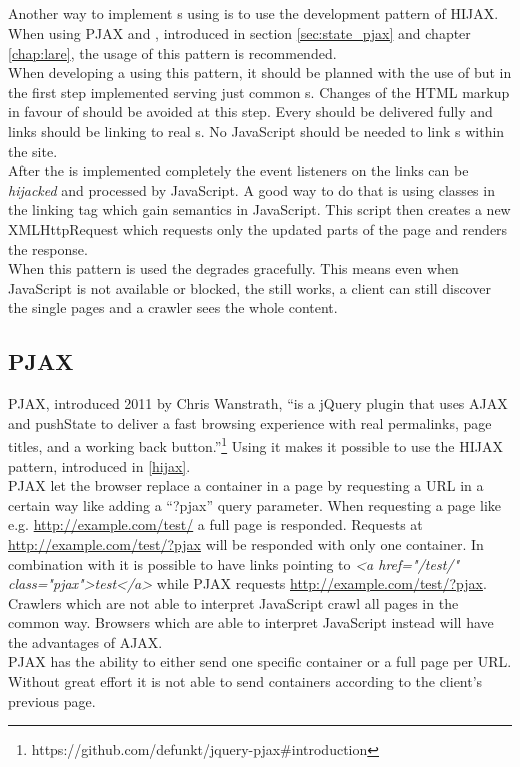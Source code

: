 \subsection{\hijax{}\label{hijax}}
Another way to implement \singlePageApplication{}s using \ajax{} is to use the development pattern of HIJAX.
When using PJAX and \lare{}, introduced in section \ref{sec:state_pjax} and chapter \ref{chap:lare}, the usage of this pattern is recommended.
\\
When developing a \webSite{} using this pattern, it should be planned with the use of \ajax{} but in the first step implemented serving just common \httpRequest{}s.
Changes of the HTML markup in favour of \ajax{} should be avoided at this step.
Every \webPage{} should be delivered fully and links should be linking to real \webPage{}s.
No JavaScript should be needed to link \webPage{}s within the site.
\\
After the \webSite{} is implemented completely the event listeners on the links can be \emph{hijacked} and processed by JavaScript.
A good way to do that is using classes in the linking tag which gain semantics in JavaScript.
This script then creates a new XMLHttpRequest which requests only the updated parts of the page and renders the response.
\\
When this pattern is used the \webSite{} degrades gracefully.
This means even when JavaScript is not available or blocked, the \webSite{} still works, a client can still discover the single pages and a crawler sees the whole content.

\subsection{PJAX\label{sec:state_pjax}}
PJAX, introduced 2011 by Chris Wanstrath, \enquote{is a jQuery plugin that uses AJAX and pushState to deliver a fast browsing experience with real permalinks, page titles, and a working back button.}\footnote{https://github.com/defunkt/jquery-pjax\#introduction}
Using it makes it possible to use the HIJAX pattern, introduced in \ref{hijax}.
\\
PJAX let the browser replace a container in a page by requesting a URL in a certain way like adding a \enquote{?pjax} query parameter.
When requesting a page like e.g. \url{http://example.com/test/} a full page is responded.
Requests at \url{http://example.com/test/?pjax} will be responded with only one container.
In combination with \hijax{} it is possible to have links pointing to \emph{<a href="/test/" class="pjax">test</a>} while PJAX requests \url{http://example.com/test/?pjax}.
Crawlers which are not able to interpret JavaScript crawl all pages in the common way.
Browsers which are able to interpret JavaScript instead will have the advantages of AJAX.
\\
PJAX has the ability to either send one specific container or a full page per URL. 
Without great effort it is not able to send containers according to the client's previous page.
